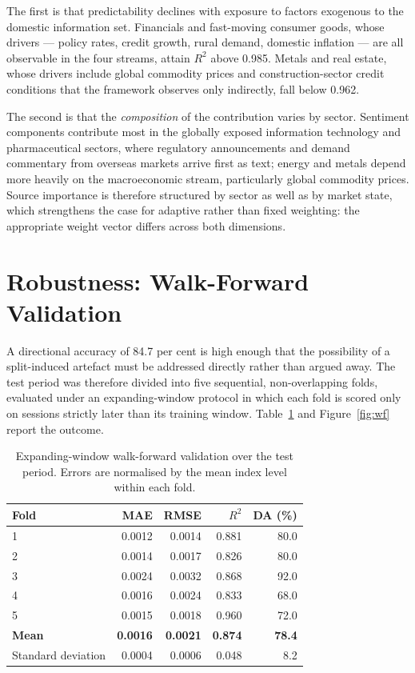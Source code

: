 The first is that predictability declines with exposure to factors exogenous to the domestic
information set. Financials and fast-moving consumer goods, whose drivers --- policy rates,
credit growth, rural demand, domestic inflation --- are all observable in the four streams,
attain $R^2$ above 0.985. Metals and real estate, whose drivers include global commodity prices
and construction-sector credit conditions that the framework observes only indirectly, fall
below 0.962.

The second is that the \emph{composition} of the contribution varies by sector. Sentiment
components contribute most in the globally exposed information technology and pharmaceutical
sectors, where regulatory announcements and demand commentary from overseas markets arrive first
as text; energy and metals depend more heavily on the macroeconomic stream, particularly global
commodity prices. Source importance is therefore structured by sector as well as by market
state, which strengthens the case for adaptive rather than fixed weighting: the appropriate
weight vector differs across both dimensions.

\section{Robustness: Walk-Forward Validation}
\label{sec:msfn-robust}

A directional accuracy of 84.7 per cent is high enough that the possibility of a split-induced
artefact must be addressed directly rather than argued away. The test period was therefore
divided into five sequential, non-overlapping folds, evaluated under an expanding-window
protocol in which each fold is scored only on sessions strictly later than its training window.
Table~\ref{tab:msfn-wf} and Figure~\ref{fig:wf} report the outcome.

\begin{table}[!htb]
\centering
\caption[Expanding-window walk-forward validation]{Expanding-window walk-forward validation over
the test period. Errors are normalised by the mean index level within each fold.}
\label{tab:msfn-wf}
\tabfont
\begin{tabular}{@{}lrrrr@{}}
\toprule
\textbf{Fold} & \textbf{MAE} & \textbf{RMSE} & \textbf{$R^2$} & \textbf{DA (\%)} \\
\midrule
1 & 0.0012 & 0.0014 & 0.881 & 80.0 \\
2 & 0.0014 & 0.0017 & 0.826 & 80.0 \\
3 & 0.0024 & 0.0032 & 0.868 & 92.0 \\
4 & 0.0016 & 0.0024 & 0.833 & 68.0 \\
5 & 0.0015 & 0.0018 & 0.960 & 72.0 \\
\midrule
\textbf{Mean} & \textbf{0.0016} & \textbf{0.0021} & \textbf{0.874} & \textbf{78.4} \\
Standard deviation & 0.0004 & 0.0006 & 0.048 & 8.2 \\
\bottomrule
\end{tabular}
\end{table}

